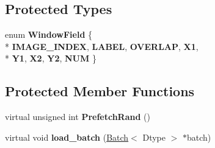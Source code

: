 \subsection*{Protected Types}
\begin{DoxyCompactItemize}
\item 
enum {\bfseries Window\+Field} \{ \\*
{\bfseries I\+M\+A\+G\+E\+\_\+\+I\+N\+D\+EX}, 
{\bfseries L\+A\+B\+EL}, 
{\bfseries O\+V\+E\+R\+L\+AP}, 
{\bfseries X1}, 
\\*
{\bfseries Y1}, 
{\bfseries X2}, 
{\bfseries Y2}, 
{\bfseries N\+UM}
 \}\hypertarget{classcaffe_1_1WindowDataLayer_a9ca81b56644734daf53ea5ac8ad5ef07}{}\label{classcaffe_1_1WindowDataLayer_a9ca81b56644734daf53ea5ac8ad5ef07}

\end{DoxyCompactItemize}
\subsection*{Protected Member Functions}
\begin{DoxyCompactItemize}
\item 
virtual unsigned int {\bfseries Prefetch\+Rand} ()\hypertarget{classcaffe_1_1WindowDataLayer_a7099d57c81d9cfe38837709b47106aa4}{}\label{classcaffe_1_1WindowDataLayer_a7099d57c81d9cfe38837709b47106aa4}

\item 
virtual void {\bfseries load\+\_\+batch} (\hyperlink{classcaffe_1_1Batch}{Batch}$<$ Dtype $>$ $\ast$batch)\hypertarget{classcaffe_1_1WindowDataLayer_a2ed13370d4ba85e0968b4efc69530720}{}\label{classcaffe_1_1WindowDataLayer_a2ed13370d4ba85e0968b4efc69530720}

\end{DoxyCompactItemize}
